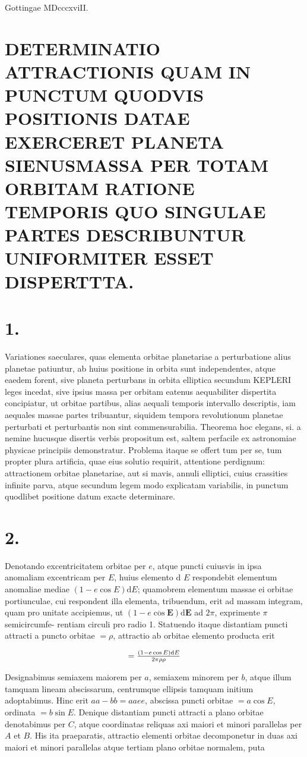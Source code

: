 \documentclass[twoside,12pt, showframe]{memoir}
\let\oldfrac\frac
\def\frac#1#2{\mathchoice{\tfrac{#1}{#2}}{\oldfrac{#1}{#2}}{\genfrac{}{}{}{2}{#1}{#2\mathstrut}}{\genfrac{}{}{}{3}{#1}{#2\mathstrut}}}
\begin{document}
Gottingae MDcccxviII.

\section*{DETERMINATIO ATTRACTIONIS QUAM IN PUNCTUM QUODVIS POSITIONIS DATAE EXERCERET PLANETA SIENUSMASSA PER TOTAM ORBITAM RATIONE TEMPORIS QUO SINGULAE PARTES DESCRIBUNTUR UNIFORMITER ESSET DISPERTTTA.}
\section*{1.}
Variationes saeculares, quas elementa orbitae planetariae a perturbatione alius planetae patiuntur, ab huius positione in orbita sunt independentes, atque eaedem forent, sive planeta perturbans in orbita elliptica secundum KEPLERI leges incedat, sive ipsius massa per orbitam eatenus aequabiliter dispertita concipiatur, ut orbitae partibus, alias aequali temporis intervallo descriptis, iam aequales massae partes tribuantur, siquidem tempora revolutionum planetae perturbati et perturbantis non sint commensurabilia. Theorema hoc elegans, si. a nemine hucusque disertis verbis propositum est, saltem perfacile ex astronomiae physicae principiis demonstratur. Problema itaque se offert tum per se, tum propter plura artificia, quae eius solutio requirit, attentione perdignum: attractionem orbitae planetariae, aut si mavis, annuli elliptici, cuius crassities infinite parva, atque secundum legem modo explicatam variabilis, in punctum quodlibet positione datum exacte determinare.

\section*{2.}
Denotando excentricitatem orbitae per \(e\), atque puncti cuiusvis in ipsa anomaliam excentricam per \(E\), huius elemento d \(E\) respondebit elementum anomaliae mediae \((1-e \cos E) \mathrm{d} E\); quamobrem elementum massae ei orbitae portiunculae, cui respondent illa elementa, tribuendum, erit ad massam integram, quam pro unitate accipiemus, ut \((1-e \overline{\cos } \boldsymbol{E}) \mathrm{d} \boldsymbol{E}\) ad \(2 \pi\), exprimente \(\pi\) semicircumfe-
rentiam circuli pro radio 1. Statuendo itaque distantiam puncti attracti a puncto orbitae \(=\rho\), attractio ab orbitae elemento producta erit

\[
=\frac{(1-e \cos E) \mathrm{d} E}{2 \pi \rho \rho}
\]

Designabimus semiaxem maiorem per \(a\), semiaxem minorem per \(b\), atque illum tamquam lineam abscissarum, centrumque ellipsis tamquam initium adoptabimus. Hinc erit \(a a-b b=a a e e\), abscissa puncti orbitae \(=a \cos E\), ordinata \(=b \sin E\). Denique distantiam puncti attracti a plano orbitae denotabimus per \(C\), atque coordinatas reliquas axi maiori et minori parallelas per \(A\) et \(B\). His ita praeparatis, attractio elementi orbitae decomponetur in duas axi maiori et minori parallelas atque tertiam plano orbitae normalem, puta
\end{document}
